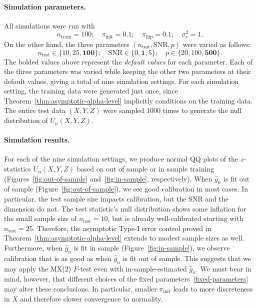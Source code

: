 \documentclass[ejs]{imsart}
\numberwithin{equation}{section}
\theoremstyle{plain}
\theoremstyle{definition}
\theoremstyle{remark}
\newcommand{\eps}{\epsilon}
\newcommand{\srx}{X}
\newcommand{\srz}{Z}
\newcommand{\sry}{Y}
\begin{document}
\paragraph{Simulation parameters.}

All simulations were run with 
\begin{equation}
	n_{\text{train}} = 100; \quad \pi_{\text{init}} = 0.1; \quad \pi_{\text{flip}} = 0.1; \quad \sigma^2_\eps = 1. 
	\label{fixed-parameters}
\end{equation}
On the other hand, the three parameters $(n_{\text{test}}, \text{SNR}, p)$ were varied as follows:
\begin{equation*}
	n_{\text{test}} \in \{10, 25, \textbf{100}\}; \quad  \text{SNR} \in \{0, \textbf{1}, 5\}; \quad p \in \{20, 100, \textbf{500}\}.
\end{equation*}
The bolded values above represent the \textit{default values} for each parameter. Each of the three parameters was varied while keeping the other two parameters at their default values, giving a total of nine simulation settings. For each simulation setting, the training data were generated just once, since Theorem~\ref{thm:asymptotic-alpha-level} implicitly conditions on the training data. The entire test data $(\srx, \sry, \srz)$  were sampled 1000 times to generate the null distribution of $U_n(\srx, \sry, \srz)$. 

\paragraph{Simulation results.}

For each of the nine simulation settings, we produce normal QQ plots of the  $z$-statistics $U_n(\srx, \sry, \srz)$ based on out of sample or in sample training (Figures~\ref{fig:out-of-sample} and~\ref{fig:in-sample}, respectively). When $\widehat g_n$ is fit out of sample (Figure~\ref{fig:out-of-sample}), we see good calibration in most cases. In particular, the test sample size impacts calibration, but the SNR and the dimension do not. The test statistic's null distribution shows some inflation for the small sample size of $n_{\text{test}} = 10$, but is already well-calibrated starting with $n_{\text{test}} = 25$. Therefore, the asymptotic Type-I error control proved in Theorem~\ref{thm:asymptotic-alpha-level} extends to modest sample sizes as well. Furthermore, when $\widehat g_n$ is fit in sample (Figure~\ref{fig:in-sample}), we observe calibration that is as good as when $\widehat g_n$ is fit out of sample. This suggests that we may apply the MX(2) $F$-test even with in-sample-estimated $\widehat g_n$. We must bear in mind, however, that different choices of the fixed parameters~\eqref{fixed-parameters} may alter these conclusions. In particular, smaller $\pi_{\text{init}}$ leads to more discreteness in $\srx$ and therefore slower convergence to normality.
\end{document}
